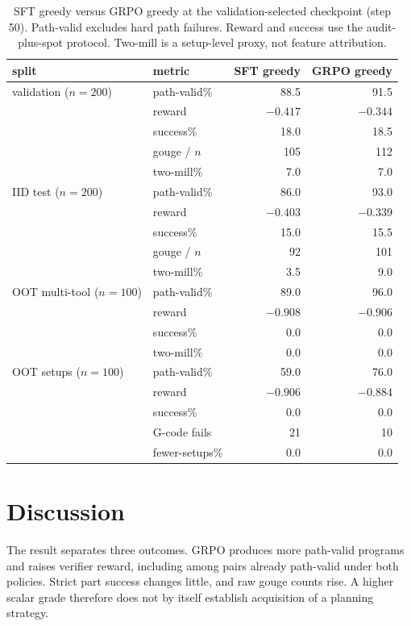 \documentclass{article}
\begin{document}
\begin{table}[t]
  \caption{SFT greedy versus GRPO greedy at the validation-selected
  checkpoint (step 50).  Path-valid excludes hard path failures.
  Reward and success use the audit-plus-spot protocol.  Two-mill is a
  setup-level proxy, not feature attribution.}
  \label{tab:policy}
  \centering
  \small
  \begin{tabular}{llrr}
    \toprule
    split & metric & SFT greedy & GRPO greedy\\
    \midrule
    validation ($n{=}200$)
      & path-valid\% & 88.5 & 91.5\\
      & reward & $-0.417$ & $-0.344$\\
      & success\% & 18.0 & 18.5\\
      & gouge / $n$ & 105 & 112\\
      & two-mill\% & 7.0 & 7.0\\
    \midrule
    IID test ($n{=}200$)
      & path-valid\% & 86.0 & 93.0\\
      & reward & $-0.403$ & $-0.339$\\
      & success\% & 15.0 & 15.5\\
      & gouge / $n$ & 92 & 101\\
      & two-mill\% & 3.5 & 9.0\\
    \midrule
    OOT multi-tool ($n{=}100$)
      & path-valid\% & 89.0 & 96.0\\
      & reward & $-0.908$ & $-0.906$\\
      & success\% & 0.0 & 0.0\\
      & two-mill\% & 0.0 & 0.0\\
    \midrule
    OOT setups ($n{=}100$)
      & path-valid\% & 59.0 & 76.0\\
      & reward & $-0.906$ & $-0.884$\\
      & success\% & 0.0 & 0.0\\
      & G-code fails & 21 & 10\\
      & fewer-setups\% & 0.0 & 0.0\\
    \bottomrule
  \end{tabular}
\end{table}

\section{Discussion}
\label{sec:discussion}

The result separates three outcomes. GRPO produces more path-valid
programs and raises verifier reward, including among pairs already
path-valid under both policies. Strict part success changes little,
and raw gouge counts rise. A higher scalar grade therefore does not
by itself establish acquisition of a planning strategy.
\end{document}
